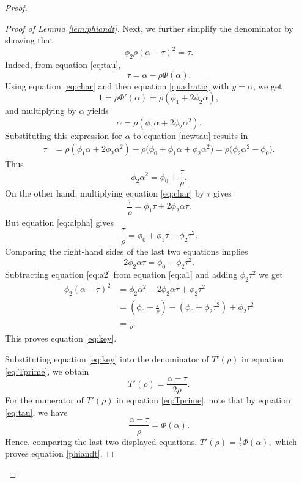 \documentclass[11pt, onesided]{amsart}
\theoremstyle{remark}
\begin{document}
\begin{proof}
\begin{proof}[Proof of Lemma \ref{lem:phiandt}]
Next, we further simplify the denominator by  showing that
\begin{equation}
\phi_2\rho(\alpha-\tau)^2=\tau.
\label{eq:key}
\end{equation}
Indeed, from equation \eqref{eq:tau},
\begin{equation} \label{newtau}
\tau=\alpha-\rho\Phi(\alpha).
\end{equation}
Using equation \eqref{eq:char} and then equation \eqref{quadratic} with $y=\alpha$, we get
\begin{equation}
1=\rho\Phi'(\alpha)=\rho(\phi_1+2\phi_2\alpha),
\end{equation}
and multiplying by $\alpha$ yields
\begin{equation}
	\alpha=\rho(\phi_1 \alpha+2\phi_2\alpha^2).
\end{equation}
Substituting this expression for $\alpha$ to equation \eqref{newtau} results in
\begin{align}
\tau
&=
\rho(\phi_1 \alpha+2\phi_2\alpha^2)-\rho
\bigl(
\phi_0+\phi_1\alpha+\phi_2\alpha^2
\bigr)
=
\rho\bigl(\phi_2\alpha^2-\phi_0\bigr).
\end{align}
Thus
\begin{equation}
\phi_2\alpha^2
=
\phi_0+\frac{\tau}{\rho}.
\label{eq:a1}
\end{equation}
On the other hand, multiplying equation \eqref{eq:char} by \(\tau\) gives
\[
\frac{\tau}{\rho}
=
\phi_1\tau+2\phi_2\alpha\tau.
\]
But equation \eqref{eq:alpha} gives
\[
\frac{\tau}{\rho}
=
\phi_0+\phi_1\tau+\phi_2\tau^2.
\]
Comparing the right-hand sides of the last two equations implies
\begin{equation}
2\phi_2\alpha\tau
=
\phi_0+\phi_2\tau^2.
\label{eq:a2}
\end{equation}
Subtracting equation \eqref{eq:a2} from equation \eqref{eq:a1} and adding $\phi_2 \tau^2$ we get
\begin{align}
\phi_2(\alpha-\tau)^2
&=
\phi_2\alpha^2
-2\phi_2\alpha\tau
+\phi_2\tau^2\\
&=
\left(\phi_0+\frac{\tau}{\rho}\right)
-\left(\phi_0+\phi_2\tau^2\right)
+\phi_2\tau^2\\
&=
\frac{\tau}{\rho}.
\end{align}
This proves equation \eqref{eq:key}.

Substituting equation \eqref{eq:key} into the denominator of $T'(\rho)$ in equation \eqref{eq:Tprime}, we obtain
\[
T'(\rho)
=
\frac{\alpha-\tau}{2\rho}.
\]
For the numerator of  $T'(\rho)$ in equation \eqref{eq:Tprime}, note that by equation \eqref{eq:tau}, we have
\[
\frac{\alpha-\tau}{\rho}=\Phi(\alpha).
\]
Hence, comparing the last two displayed equations, 
$
T'(\rho)=\frac{1}{2}\Phi(\alpha),
$
which proves equation \eqref{phiandt}.
\end{proof}



\end{proof}
\end{document}
